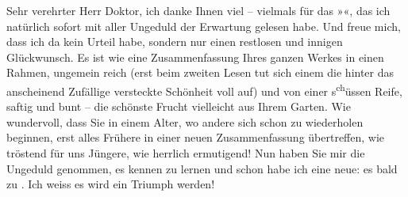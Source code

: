 \pstart{}Sehr verehrter Herr Doktor,\pend\vspace{0.5em}
\pstart
           ich danke Ihnen viel – vielmals für das »\label{K_L03627-2v}\label{K_L03627-2}«, das ich natürlich sofort mit aller Ungeduld der Erwartung
                    gelesen habe. Und freue mich, dass ich da kein Urteil habe, sondern nur einen
                    restlosen und innigen Glückwunsch. Es ist wie eine Zusammenfassung Ihres ganzen
                    Werkes in einen Rahmen, ungemein reich (erst beim zweiten Lesen tut sich einem
                    die hinter das anscheinend Zufällige versteckte Schönheit voll auf) und von
                    einer s\substVorne{}\textsuperscript{ch}\substDazwischen{}ü\substHinten{}ssen Reife, saftig und bunt – die schönste Frucht vielleicht aus {\pb}Ihrem Garten. Wie wundervoll, dass
                    Sie in einem Alter, wo andere sich schon zu wiederholen beginnen, erst alles
                    Frühere in einer neuen Zusammenfassung übertreffen, wie tröstend für uns
                    Jüngere, wie herrlich ermutigend! Nun haben Sie mir die Ungeduld genommen, es
                    kennen zu lernen und schon habe ich eine neue: es bald \label{K_L03627-3v}\label{K_L03627-3} zu \label{T_L03627-1v}\label{T_L03627-1}. Ich weiss es wird ein
                    Triumph werden!\pend
           
